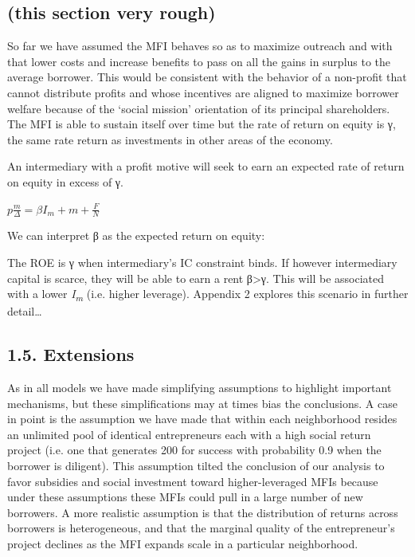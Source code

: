 \documentclass[
]{article}
\begin{document}
\hypertarget{this-section-very-rough}{%
\subsection{(this section very rough)}\label{this-section-very-rough}}

So far we have assumed the MFI behaves so as to maximize outreach and
with that lower costs and increase benefits to pass on all the gains in
surplus to the average borrower. This would be consistent with the
behavior of a non-profit that cannot distribute profits and whose
incentives are aligned to maximize borrower welfare because of the
`social mission' orientation of its principal shareholders. The MFI is
able to sustain itself over time but the rate of return on equity is γ,
the same rate return as investments in other areas of the economy.

An intermediary with a profit motive will seek to earn an expected rate
of return on equity in excess of γ.

\(p\frac{m}{\Delta} = \beta I_{m} + m + \frac{F}{N}\)

We can interpret β as the expected return on equity:

The ROE is γ when intermediary's IC constraint binds. If however
intermediary capital is scarce, they will be able to earn a rent
β\textgreater{}γ. This will be associated with a lower
\emph{I\textsubscript{m }}(i.e. higher leverage). Appendix 2 explores
this scenario in further detail\ldots{}

\hypertarget{extensions}{%
\subsection{1.5. Extensions}\label{extensions}}

As in all models we have made simplifying assumptions to highlight
important mechanisms, but these simplifications may at times bias the
conclusions. A case in point is the assumption we have made that within
each neighborhood resides an unlimited pool of identical entrepreneurs
each with a high social return project (i.e. one that generates 200 for
success with probability 0.9 when the borrower is diligent). This
assumption tilted the conclusion of our analysis to favor subsidies and
social investment toward higher-leveraged MFIs because under these
assumptions these MFIs could pull in a large number of new borrowers. A
more realistic assumption is that the distribution of returns across
borrowers is heterogeneous, and that the marginal quality of the
entrepreneur's project declines as the MFI expands scale in a particular
neighborhood.
\end{document}
